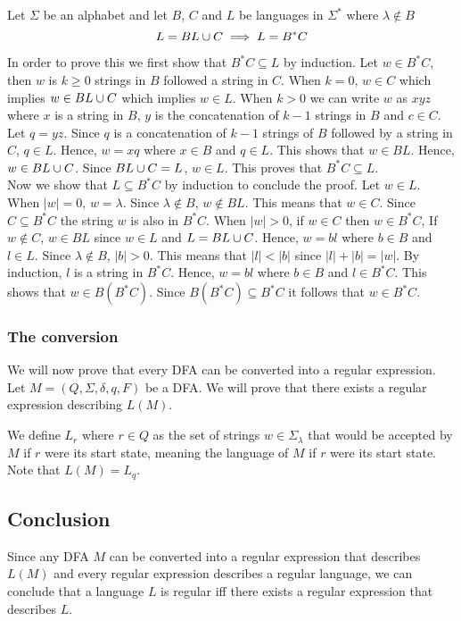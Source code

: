 \documentclass{article}
\newcommand{\emptyString}{\lambda}
\begin{document}
Let \(\Sigma\) be an alphabet and let \(B\), \(C\) and \(L\) be languages in \(\Sigma^*\) where \(\emptyString \notin B\)
\[
    L=BL\cup C \implies L=B^*C
\]

In order to prove this we first show that \(B^*C \subseteq L\) by induction.
Let \(w \in B^*C\), then \(w\) is \(k\geq 0\) strings in \(B\) followed a string in \(C\).
When \(k=0\), \(w \in C\) which implies \(w \in BL\cup C\) which implies \(w \in L\).
When \(k > 0\) we can write \(w\) as \(xyz\) where \(x\) is a string in \(B\),
\(y\) is the concatenation of \(k-1\) strings in \(B\) and \(c \in C\).
Let \(q=yz\). Since \(q\) is a concatenation of \(k-1\) strings of \(B\) followed by a string in \(C\),
\(q \in L\). Hence, \(w=xq\) where \(x\in B\) and \(q\in L\). This shows that \(w \in BL\).
Hence, \(w \in BL\cup C\). Since \(BL \cup C = L\), \(w \in L\). This proves that
\(B^*C\subseteq L\). \\
Now we show that \(L \subseteq B^*C\) by induction to conclude the proof.
Let \(w\in L\). When \(|w|=0\), \(w=\emptyString\). Since \(\emptyString \notin B\),
\(w \notin BL\). This means that \(w\in C\). Since \(C \subseteq B^*C\) the string \(w\)
is also in \(B^*C\). When \(|w| > 0\), if \(w \in C\) then \(w \in B^*C\),
If \(w \notin C\), \(w \in BL\) since \(w \in L\) and \(L=BL\cup C\).
Hence, \(w=bl\) where \(b\in B\) and \(l\in L\).
Since \(\emptyString \notin B\), \(|b|>0\). This means that \(|l|<|b|\)
since \(|l|+|b|=|w|\). By induction, \(l\) is a string in \(B^*C\).
Hence, \(w = bl\) where \(b\in B\) and \(l\in B^*C\). This shows that \(w \in B(B^*C)\).
Since \(B(B^*C) \subseteq B^*C\) it follows that \(w \in B^*C\).

\subsubsection{The conversion}

We will now prove that every DFA can be converted into a regular expression.
Let \(M=(Q, \Sigma, \delta, q, F)\) be a DFA. We will prove that there exists a regular
expression describing \(L(M)\).

We define \(L_r\) where \(r \in Q\) as the set of strings \(w \in \Sigma_\emptyString\)
that would be accepted by \(M\) if \(r\) were its start state, meaning the language of \(M\)
if \(r\) were its start state. Note that \(L(M)=L_q\).

\subsection{Conclusion}

Since any DFA \(M\) can be converted into a regular expression that describes \(L(M)\)
and every regular expression describes a regular language, we can conclude that a language \(L\)
is regular iff there exists a regular expression that describes \(L\).
\end{document}

